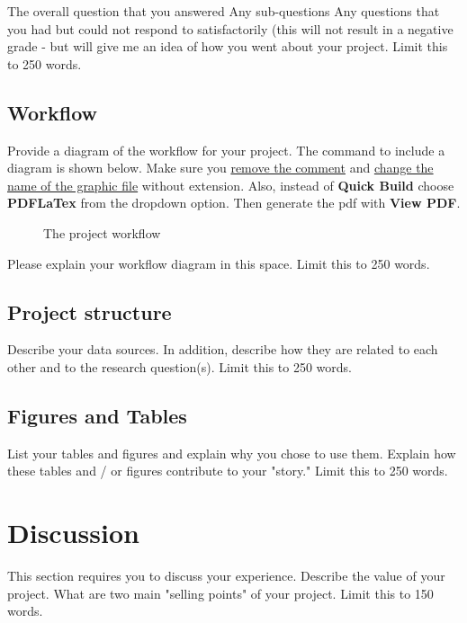 \documentclass{article}
\begin{document}
The overall question that you answered
Any sub-questions
Any questions that you had but could not respond to satisfactorily (this will not result in a negative grade - but will give me an idea of how you went about your project. Limit this to 250 words.

\subsection{Workflow}

Provide a diagram of the workflow for your project. The command to include a diagram is shown below. Make sure you \underline{remove the comment} and \underline{change the name of the graphic file} without extension. Also, instead of \textbf{Quick Build} choose \textbf{PDFLaTex} from the dropdown option. Then generate the pdf with \textbf{View PDF}.



\begin{figure}[hb]
  \centering
  \caption{The project workflow}

\end{figure}


Please explain your workflow diagram in this space. Limit this to 250 words.


\subsection{Project structure}

Describe your data sources. In addition, describe how they are related to each other and to the research question(s). Limit this to 250 words.

\subsection{Figures and Tables}

List your tables and figures and explain why you chose to use them. Explain how these tables and / or figures contribute to your "story." Limit this to 250 words.


\section{Discussion}

This section requires you to discuss your experience. Describe the value of your project. What are two main "selling points" of your project. Limit this to 150 words.
\end{document}
